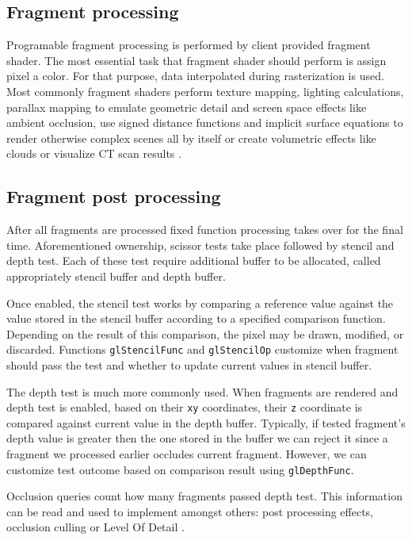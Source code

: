 \subsection{Fragment processing}

Programable fragment processing is performed by client provided fragment shader. The most essential task that fragment shader should perform is assign pixel a color.
For that purpose, data interpolated during rasterization is used. 
Most commonly fragment shaders perform texture mapping, lighting calculations, parallax mapping to emulate geometric detail and screen space effects like ambient occlusion, 
use signed distance functions and implicit surface equations to render otherwise complex scenes all by itself or create volumetric effects like clouds or visualize CT scan results \cite{rtrendering} \cite{glsuperbible}.

\subsection{Fragment post processing}

After all fragments are processed fixed function processing takes over for the final time.
Aforementioned ownership, scissor tests take place followed by stencil and depth test.
Each of these test require additional buffer to be allocated, called appropriately stencil buffer and depth buffer.

Once enabled, the stencil test works by comparing a reference value against the value stored in the stencil buffer according to a specified comparison function. 
Depending on the result of this comparison, the pixel may be drawn, modified, or discarded. 
Functions \texttt{glStencilFunc} and \texttt{glStencilOp} customize when fragment should pass the test and whether to update current values in stencil buffer.

The depth test is much more commonly used. 
When fragments are rendered and depth test is enabled, based on their \texttt{xy} coordinates, their \texttt{z} coordinate is compared against current value in the depth buffer.
Typically, if tested fragment's depth value is greater then the one stored in the buffer we can reject it since a fragment we processed earlier occludes current fragment.
However, we can customize test outcome based on comparison result using \texttt{glDepthFunc}.

Occlusion queries count how many fragments passed depth test. This information can be read and used to implement amongst others: post processing effects, occlusion culling or Level Of Detail \cite{rtrendering}.

